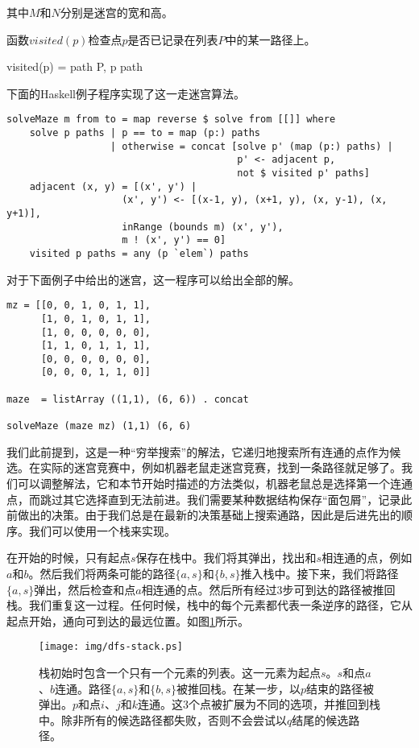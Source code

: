 \documentclass[UTF8]{article}
\begin{document}
其中$M$和$N$分别是迷宫的宽和高。

函数$visited(p)$检查点$p$是否已记录在列表$P$中的某一路径上。

\be
visited(p) = \exists path \in P, p \in path
\ee

下面的Haskell例子程序实现了这一走迷宫算法。

\lstset{language=Haskell}
\begin{lstlisting}
solveMaze m from to = map reverse $ solve from [[]] where
    solve p paths | p == to = map (p:) paths
                  | otherwise = concat [solve p' (map (p:) paths) |
                                        p' <- adjacent p,
                                        not $ visited p' paths]
    adjacent (x, y) = [(x', y') |
                    (x', y') <- [(x-1, y), (x+1, y), (x, y-1), (x, y+1)],
                    inRange (bounds m) (x', y'),
                    m ! (x', y') == 0]
    visited p paths = any (p `elem`) paths
\end{lstlisting} %

对于下面例子中给出的迷宫，这一程序可以给出全部的解。

\lstset{language=Haskell}
\begin{lstlisting}
mz = [[0, 0, 1, 0, 1, 1],
      [1, 0, 1, 0, 1, 1],
      [1, 0, 0, 0, 0, 0],
      [1, 1, 0, 1, 1, 1],
      [0, 0, 0, 0, 0, 0],
      [0, 0, 0, 1, 1, 0]]

maze  = listArray ((1,1), (6, 6)) . concat

solveMaze (maze mz) (1,1) (6, 6)
\end{lstlisting}

我们此前提到，这是一种“穷举搜索”的解法，它递归地搜索所有连通的点作为候选。在实际的迷宫竞赛中，例如机器老鼠走迷宫竞赛，找到一条路径就足够了。我们可以调整解法，它和本节开始时描述的方法类似，机器老鼠总是选择第一个连通点，而跳过其它选择直到无法前进。我们需要某种数据结构保存“面包屑”，记录此前做出的决策。由于我们总是在最新的决策基础上搜索通路，因此是后进先出的顺序。我们可以使用一个栈来实现。

在开始的时候，只有起点$s$保存在栈中。我们将其弹出，找出和$s$相连通的点，例如$a$和$b$。然后我们将两条可能的路径$\{a, s\}$和$\{b, s\}$推入栈中。接下来，我们将路径$\{a, s\}$弹出，然后检查和点$a$相连通的点。然后所有经过3步可到达的路径被推回栈。我们重复这一过程。任何时候，栈中的每个元素都代表一条逆序的路径，它从起点开始，通向可到达的最远位置。如图\ref{fig:dfs-stack}所示。

\begin{figure}[htbp]
 \centering
 \texttt{[image: img/dfs-stack.ps]}
 \caption{栈初始时包含一个只有一个元素的列表。这一元素为起点$s$。$s$和点$a$、$b$连通。路径$\{a, s\}$和$\{b, s\}$被推回栈。在某一步，以$p$结束的路径被弹出。$p$和点$i$、$j$和$k$连通。这3个点被扩展为不同的选项，并推回到栈中。除非所有的候选路径都失败，否则不会尝试以$q$结尾的候选路径。}
 \label{fig:dfs-stack}
\end{figure}
\end{document}
